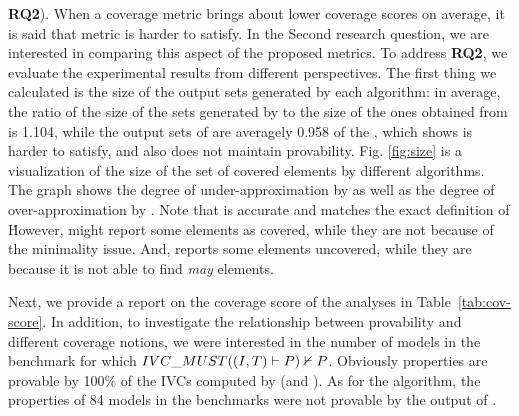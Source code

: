 \textbf{RQ2}). When a coverage metric brings about lower coverage scores on average,
it is said that metric is harder to satisfy. In the Second research question,
we are interested in comparing this aspect of the proposed metrics. To address \textbf{RQ2}, we evaluate the experimental results from different perspectives. The first thing we calculated is the size of the output sets generated by each algorithm: in average, the ratio of the size of the sets generated by \ucalg to the size of the ones obtained from \ucbfalg is 1.104, while the output sets of \mustalg are averagely 0.958 of the \ucbfalg, which shows \mustalg is harder to satisfy, and also does not maintain provability. Fig. \ref{fig:size} is a visualization of the size of the set of covered elements by different algorithms. The graph shows the degree of under-approximation by \mustalg as well as the degree of over-approximation by \ucalg.
Note that \ucbfalg is accurate and matches the exact definition of \ivccov\. However, \ucalg might report some elements as covered, while they are not because of the minimality issue. And, \mustalg reports some elements uncovered, while they are because it is not able to find \emph{may} elements.

Next, we provide a report on the coverage score of the analyses in Table~\ref{tab:cov-score}. In addition, to investigate
the relationship between provability and different coverage notions,
we were interested in the number of models in the benchmark for which ${IVC\_MUST} ((I, T) \vdash P) \nvdash P$.
Obviously properties are provable by 100\% of the IVCs computed by \ucalg (and \ucbfalg).
As for the \mustalg algorithm, the properties of 84 models in the benchmarks were not provable by the output of \mustalg.


